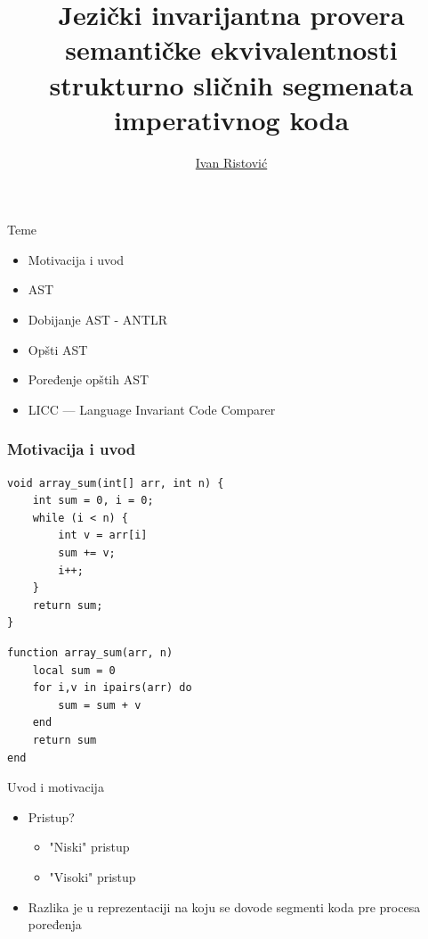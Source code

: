 \documentclass{beamer}
\title{Jezi\v{c}ki invarijantna provera semanti\v{c}ke ekvivalentnosti strukturno sli\v{c}nih segmenata imperativnog koda}
\author{\href{mailto:ivan_ristovic@math.rs}{Ivan Ristovi\'c}}
\date{}
\begin{document}
\begin{frame}
    \titlepage
\end{frame}

\begin{frame}{Teme}
    \begin{itemize}
        \item Motivacija i uvod
        \item AST
        \item Dobijanje AST - ANTLR
        \item Op\v{s}ti AST
        \item Poređenje op\v{s}tih AST
        \item LICC --- Language Invariant Code Comparer
    \end{itemize}
\end{frame}

\begin{frame}[fragile]
\frametitle{Motivacija i uvod}
\begin{lstlisting}
void array_sum(int[] arr, int n) {
    int sum = 0, i = 0;
    while (i < n) {
        int v = arr[i]
        sum += v;
        i++;
    }
    return sum;
}
\end{lstlisting}
\begin{lstlisting}
function array_sum(arr, n)
    local sum = 0
    for i,v in ipairs(arr) do
        sum = sum + v
    end
    return sum
end
\end{lstlisting}
\end{frame}

\begin{frame}{Uvod i motivacija}
    \begin{itemize}
        \item Pristup?
        \begin{itemize}
            \item "Niski" pristup
            \item "Visoki" pristup 
        \end{itemize}
        \item Razlika je u reprezentaciji na koju se dovode segmenti koda pre procesa poređenja
    \end{itemize}
\end{frame}
\end{document}
